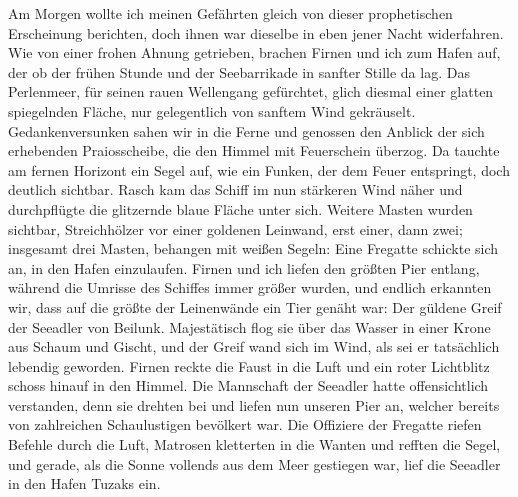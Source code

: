 Am Morgen wollte ich meinen Gefährten gleich von dieser prophetischen Erscheinung berichten, doch ihnen war dieselbe in eben jener Nacht widerfahren. Wie von einer frohen Ahnung getrieben, brachen Firnen und ich zum Hafen auf, der ob der frühen Stunde und der Seebarrikade in sanfter Stille da lag. Das Perlenmeer, für seinen rauen Wellengang gefürchtet, glich diesmal einer glatten spiegelnden Fläche, nur gelegentlich von sanftem Wind gekräuselt. Gedankenversunken sahen wir in die Ferne und genossen den Anblick der sich erhebenden Praiosscheibe, die den Himmel mit Feuerschein überzog. Da tauchte am fernen Horizont ein Segel auf, wie ein Funken, der dem Feuer entspringt, doch deutlich sichtbar. Rasch kam das Schiff im nun stärkeren Wind näher und durchpflügte die glitzernde blaue Fläche unter sich. Weitere Masten wurden sichtbar, Streichhölzer vor einer goldenen Leinwand, erst einer, dann zwei; insgesamt drei Masten, behangen mit weißen Segeln: Eine Fregatte schickte sich an, in den Hafen einzulaufen. Firnen und ich liefen den größten Pier entlang, während die Umrisse des Schiffes immer größer wurden, und endlich erkannten wir, dass auf die größte der Leinenwände ein Tier genäht war: Der güldene Greif der Seeadler von Beilunk. Majestätisch flog sie über das Wasser in einer Krone aus Schaum und Gischt, und der Greif wand sich im Wind, als sei er tatsächlich lebendig geworden. Firnen reckte die Faust in die Luft und ein roter Lichtblitz schoss hinauf in den Himmel. Die Mannschaft der Seeadler hatte offensichtlich verstanden, denn sie drehten bei und liefen nun unseren Pier an, welcher bereits von zahlreichen Schaulustigen bevölkert war. Die Offiziere der Fregatte riefen Befehle durch die Luft, Matrosen kletterten in die Wanten und refften die Segel, und gerade, als die Sonne vollends aus dem Meer gestiegen war, lief die Seeadler in den Hafen Tuzaks ein.

